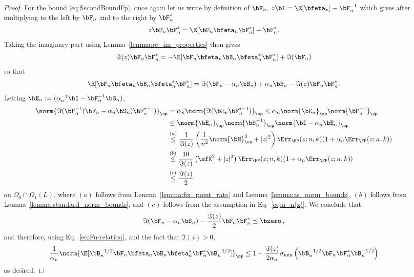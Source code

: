 \begin{proof}
For the bound \eqref{eq:SecondBoundFp}, once again let us write by definition of $\bF_n$,
   $z\bI = \E[\bfeta_n] - \bF_n^{-1}$
which gives after multiplying to the left by $\bF_n$ and to the right by $\bF_n^*$
\begin{equation}
\nonumber
    z \bF_n \bF_n^* =  \E[\bF_n \bfeta_n \bF_n^*] - \bF_n^*.
\end{equation}
Taking the imaginary part using Lemma~\ref{lemma:re_im_properties} then gives
\begin{equation}
\nonumber
    \Im(z) \bF_n \bF_n^* = - \E[\bF_n \bfeta_n\bB_n \bfeta_n^* \bF_n^*]  + \Im ( \bF_n)
\end{equation}
so that
\begin{equation}\label{eq:Fn-relation}
    \E[\bF_n \bfeta_n \bB_n \bfeta_n^* \bF_n^*] = \Im(\bF_n - \alpha_n\bS_n)  + \alpha_n\bB_n - \Im(z) \bF_n\bF_n^*.
\end{equation}
Letting $\bE_n := (\alpha_n^{-1}\bI  -\bF_n^{-1} \bS_n)$,
\begin{align*}
    \norm{\Im(  \bF_n^{-1} (\bF_n - \alpha_n\bS_n) \bF_{n}^{*-1})}_\op
    &=
   \alpha_n \norm{\Im(   \bE_n \bF_{n}^{*-1})}_\op
   \le  
    \alpha_n\norm{\bE_n}_\op\norm{\bF_n^{-1}}_\op\\
    &
    \le \norm{\bE_n}_\op \norm{\bS_n^{-1}}_\op \norm{\bI - \alpha_n\bE_n}_\op\\
    &\stackrel{(a)}\le \frac1{\Im(z)} \left(\frac{1}{n^2}\norm{\bH}_\op^2  + |z|^2\right) \Err_{\FP}(z;n,k) (1 + \alpha_n\Err_{\FP}(z; n, k))\\
    &\stackrel{(b)}\le \frac{10}{\Im(z)} \left(\sfK^2  + |z|^2\right) \Err_{\FP}(z;n,k) (1 + \alpha_n\Err_{\FP}(z; n, k))\\
    &\stackrel{(c)}\le \frac{\Im(z)}{2}
\end{align*}
on $\Omega_0 \cap\Omega_1(L)$,
where $(a)$ follows from Lemma~\ref{lemma:fix_point_rate}
and Lemma \ref{lemma:as_norm_bounds}, $(b)$ follows from Lemma~\ref{lemma:standard_norm_bounds}, and $(c)$ follows from the assumption in Eq.~\eqref{eq:n_n(z)}.
We conclude that
\begin{equation}
\nonumber
    \Im(\bF_n - \alpha_n\bS_n) - \frac{\Im(z)}{2}\bF_n\bF_n^* \preceq \bzero\, ,
\end{equation}
and therefore, using Eq.~\eqref{eq:Fn-relation},
and the fact that $\Im(z)>0$,
\begin{equation}
\nonumber
    \frac1{\alpha_n}\norm{\E[\bB_n^{-1/2}\bF_n \bfeta_n \bB_n \bfeta_n^* \bF_n^* \bB_n^{-1/2}]  }_\op
    \le 1 -  \frac{\Im(z)}{2\alpha_n}\sigma_{\min} \left(\bB_n^{-1/2} \bF_n\bF_n^* \bB_n^{-1/2}\right)
\end{equation}
as desired.
\end{proof}


